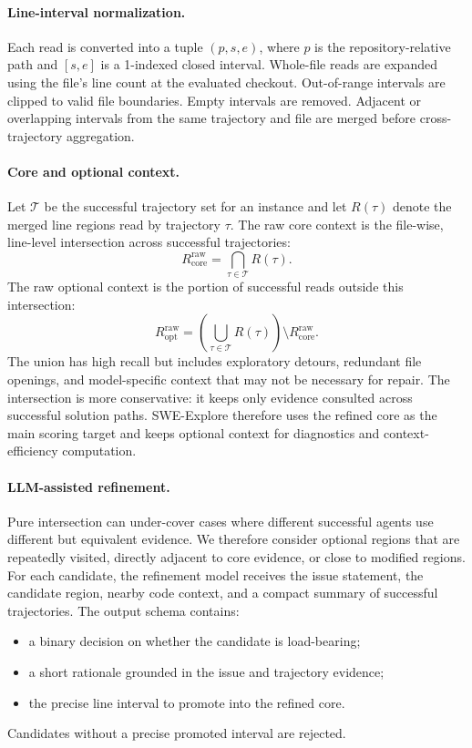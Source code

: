 \paragraph{Line-interval normalization.}
Each read is converted into a tuple $(p,s,e)$, where $p$ is the
repository-relative path and $[s,e]$ is a 1-indexed closed interval. Whole-file
reads are expanded using the file's line count at the evaluated checkout.
Out-of-range intervals are clipped to valid file boundaries. Empty intervals are
removed. Adjacent or overlapping intervals from the same trajectory and file are
merged before cross-trajectory aggregation.

\paragraph{Core and optional context.}
Let $\mathcal{T}$ be the successful trajectory set for an instance and let
$R(\tau)$ denote the merged line regions read by trajectory $\tau$. The raw core
context is the file-wise, line-level intersection across successful trajectories:
\[
R^{\mathrm{raw}}_{\mathrm{core}}
=
\bigcap_{\tau \in \mathcal{T}} R(\tau).
\]
The raw optional context is the portion of successful reads outside this
intersection:
\[
R^{\mathrm{raw}}_{\mathrm{opt}}
=
\left(\bigcup_{\tau \in \mathcal{T}} R(\tau)\right)
\setminus R^{\mathrm{raw}}_{\mathrm{core}}.
\]
The union has high recall but includes exploratory detours, redundant file
openings, and model-specific context that may not be necessary for repair. The
intersection is more conservative: it keeps only evidence consulted across
successful solution paths. SWE-Explore therefore uses the refined core as the
main scoring target and keeps optional context for diagnostics and
context-efficiency computation.

\paragraph{LLM-assisted refinement.}
Pure intersection can under-cover cases where different successful agents use
different but equivalent evidence. We therefore consider optional regions that
are repeatedly visited, directly adjacent to core evidence, or close to modified
regions. For each candidate, the refinement model receives the issue statement,
the candidate region, nearby code context, and a compact summary of successful
trajectories. The output schema contains:
\begin{itemize}
    \item a binary decision on whether the candidate is load-bearing;
    \item a short rationale grounded in the issue and trajectory evidence;
    \item the precise line interval to promote into the refined core.
\end{itemize}
Candidates without a precise promoted interval are rejected.

